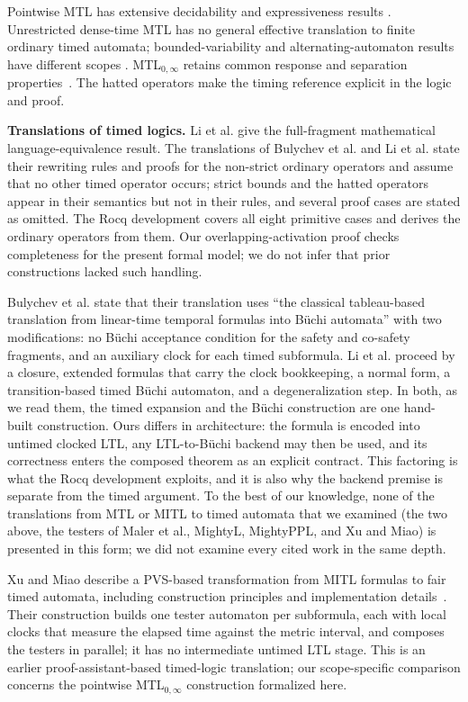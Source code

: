 \documentclass{ieeeaccess}
\newcommand{\runinhead}[1]{\par\noindent\textbf{#1}\enspace}
\begin{document}
Pointwise MTL has extensive decidability and expressiveness results
\cite{[RK90],[RTH96],MTLsem,ouaknine_worrell_lics05,
bouyer_chevalier_markey_fsttcs05}. Unrestricted dense-time MTL has no general
effective translation to finite ordinary timed automata; bounded-variability
and alternating-automaton results have different scopes
\cite{nickovic_piterman_formats10,[BM14]}. MTL$_{0,\infty}$ retains common
response and separation properties~\cite{[RTH96],[BDLG14]}. The hatted
operators make the timing reference explicit in the logic and proof.

\runinhead{Translations of timed logics.}
Li et al. give the full-fragment mathematical language-equivalence
result. The translations of Bulychev et al. and Li et al. state their rewriting
rules and proofs for the non-strict ordinary operators and assume that no other
timed operator occurs; strict bounds and the hatted operators appear in their
semantics but not in their rules, and several proof cases are stated as omitted.
The Rocq development covers all eight primitive cases and derives the ordinary
operators from them. Our overlapping-activation proof checks completeness for the present
formal model; we do not infer that prior constructions lacked such handling.

Bulychev et al. state that their translation uses ``the classical
tableau-based translation from linear-time temporal formulas into B\"uchi
automata'' with two modifications: no B\"uchi acceptance condition for the
safety and co-safety fragments, and an auxiliary clock for each timed
subformula. Li et al. proceed by a closure, extended formulas that carry the
clock bookkeeping, a normal form, a transition-based timed B\"uchi automaton,
and a degeneralization step. In both, as we read them, the timed expansion and the B\"uchi
construction are one hand-built construction. Ours differs in architecture:
the formula is encoded into untimed clocked LTL, any LTL-to-B\"uchi backend
may then be used, and its correctness enters the composed theorem as an
explicit contract. This factoring is what the Rocq development exploits, and
it is also why the backend premise is separate from the timed argument.
To the best of our knowledge, none of the translations from MTL or MITL to
timed automata that we examined (the two above, the testers of Maler et al.,
MightyL, MightyPPL, and Xu and Miao) is presented in this form; we did not examine every
cited work in the same depth.

Xu and Miao describe a PVS-based transformation from MITL formulas to fair
timed automata, including construction principles and implementation
details~\cite{xu08}. Their construction builds one tester automaton per
subformula, each with local clocks that measure the elapsed time against the
metric interval, and composes the testers in parallel; it has no intermediate
untimed LTL stage. This is an earlier proof-assistant-based timed-logic
translation; our scope-specific comparison concerns the pointwise
MTL$_{0,\infty}$ construction formalized here.
\end{document}
